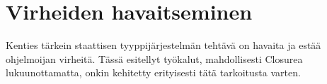 \chapter{Virheiden havaitseminen}

Kenties tärkein staattisen tyyppijärjestelmän tehtävä on havaita ja estää
ohjelmoijan virheitä. Tässä esitellyt työkalut, mahdollisesti Closurea
lukuunottamatta, onkin kehitetty erityisesti tätä tarkoitusta varten.